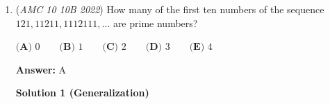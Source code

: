 \begin{enumerate}
\textbf{Solution 2 (Brute Force)}

Since these numbers are fairly small, we can use brute force as follows: 
 \[\frac{(1+\frac{1}{3})(1+\frac{1}{5})(1+\frac{1}{7})}{\sqrt{(1-\frac{1}{3^2})(1-\frac{1}{5^2})(1-\frac{1}{7^2})}} =\frac{\frac{4}{3}\cdot\frac{6}{5}\cdot\frac{8}{7}}{\sqrt{\frac{8}{9}\cdot\frac{24}{25}\cdot\frac{48}{49}}} =\frac{\frac{4\cdot6\cdot8}{3\cdot5\cdot7}}{\sqrt{\frac{(2^3)(2^3\cdot3^1)(2^4\cdot3^1)}{(3^2)(5^2)(7^2)}}} =\frac{\frac{64}{35}}{\frac{96}{105}}=\frac{64}{35}\cdot\frac{105}{96}=\boxed{\textbf{(B)}\ 2}.\]~not\_slay

 



\textbf{Solution 3 (Brute Force)}

This solution starts precisely like the one above. We simplify to get the following:

 
 \[\frac{(1+\frac{1}{3})(1+\frac{1}{5})(1+\frac{1}{7})}{\sqrt{(1-\frac{1}{3^2})(1-\frac{1}{5^2})(1-\frac{1}{7^2})}} = \frac{\frac{4\cdot6\cdot8}{3\cdot5\cdot7}}{\sqrt{\frac{(2^3)(2^3\cdot3^1)(2^4\cdot3^1)}{(3^2)(5^2)(7^2)}}}\]

 But now, we can get a nice simplification as shown: 
 \[\frac{\frac{4\cdot6\cdot8}{3\cdot5\cdot7}}{\sqrt{\frac{(2^3)(2^3\cdot3^1)(2^4\cdot3^1)}{(3^2)(5^2)(7^2)}}} = \dfrac{\frac{4\cdot6\cdot8}{3\cdot5\cdot7}}{\sqrt{\frac{2^{10} \cdot 3^{2}}{3^2\cdot 5^2\cdot 7^2}}} = \dfrac{\frac{4\cdot6\cdot8}{3\cdot5\cdot7}}{\frac{2^5 \cdot 3}{3\cdot5\cdot 7}}  =\dfrac{4\cdot6\cdot8}{3\cdot5\cdot7} \hspace{0.05 in} \cdot \hspace{0.05 in}\dfrac{3\cdot5\cdot 7}{2^5 \cdot 3}  =\dfrac{2^6\cdot 3}{2^5\cdot 3} = \boxed{\textbf{(B)}\ 2}.\]



	\item (\textit{AMC 10 10B 2022}) How many of the first ten numbers of the sequence $121, 11211, 1112111, \ldots$ are prime numbers?


 $\textbf{(A) } 0 \qquad \textbf{(B) }1 \qquad \textbf{(C) }2 \qquad \textbf{(D) }3 \qquad \textbf{(E) }4$

 \textbf{Answer: }A



\textbf{Solution 1 (Generalization)}


\end{enumerate}

